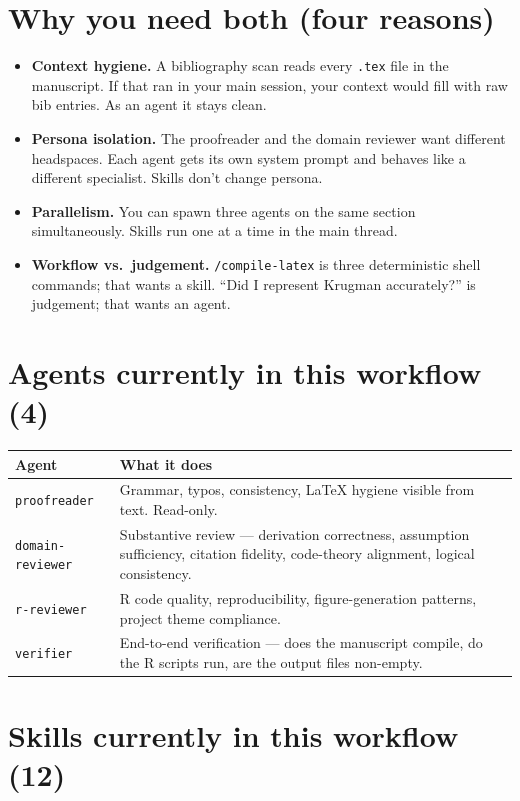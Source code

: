\documentclass[10pt]{article}
\begin{document}
\section*{Why you need both (four reasons)}

\begin{itemize}[leftmargin=1.4em, itemsep=0.15em]
  \item \textbf{Context hygiene.} A bibliography scan reads every \texttt{.tex} file in the manuscript. If that ran in your main session, your context would fill with raw bib entries. As an agent it stays clean.
  \item \textbf{Persona isolation.} The proofreader and the domain reviewer want different headspaces. Each agent gets its own system prompt and behaves like a different specialist. Skills don't change persona.
  \item \textbf{Parallelism.} You can spawn three agents on the same section simultaneously. Skills run one at a time in the main thread.
  \item \textbf{Workflow vs.\ judgement.} \texttt{/compile-latex} is three deterministic shell commands; that wants a skill. ``Did I represent Krugman accurately?'' is judgement; that wants an agent.
\end{itemize}

\section*{Agents currently in this workflow (4)}

\begin{tabular}{l p{}}
\toprule
Agent & What it does\\
\midrule
\texttt{proofreader}      & Grammar, typos, consistency, LaTeX hygiene visible from text. Read-only.\\
\texttt{domain-reviewer}  & Substantive review --- derivation correctness, assumption sufficiency, citation fidelity, code-theory alignment, logical consistency.\\
\texttt{r-reviewer}       & R code quality, reproducibility, figure-generation patterns, project theme compliance.\\
\texttt{verifier}         & End-to-end verification --- does the manuscript compile, do the R scripts run, are the output files non-empty.\\
\bottomrule
\end{tabular}

\section*{Skills currently in this workflow (12)}
\end{document}
